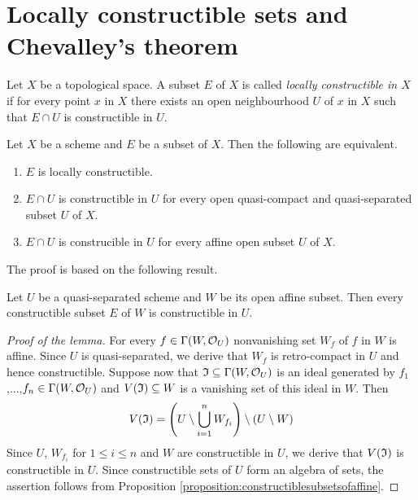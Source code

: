 \section{Locally constructible sets and Chevalley's theorem}

\begin{definition}
Let $X$ be a topological space. A subset $E$ of $X$ is called \textit{locally constructible in $X$} if for every point $x$ in $X$ there exists an open neighbourhood $U$ of $x$ in $X$ such that $E\cap U$ is constructible in $U$.
\end{definition}

\begin{theorem}\label{theorem:locallyconstructibleonschemes}
Let $X$ be a scheme and $E$ be a subset of $X$. Then the following are equivalent.
\begin{enumerate}[label=\emph{\textbf{(\roman*)}}, leftmargin=*]
\item $E$ is locally constructible.
\item $E\cap U$ is constructible in $U$ for every open quasi-compact and quasi-separated subset $U$ of $X$.
\item $E\cap U$ is construcible in $U$ for every affine open subset $U$ of $X$.
\end{enumerate} 
\end{theorem}
\noindent
The proof is based on the following result.

\begin{lemma}\label{lemma:affineinqsandcontructibility}
Let $U$ be a quasi-separated scheme and $W$ be its open affine subset. Then every constructible subset $E$ of $W$ is constructible in $U$.
\end{lemma}
\begin{proof}[Proof of the lemma]
For every $f\in \Gamma(W,{\mathcal O}_U)$ nonvanishing set $W_f$ of $f$ in $W$ is affine. Since $U$ is quasi-separated, we derive that $W_f$ is retro-compact in $U$ and hence constructible. Suppose now that $\mathfrak{I}\subseteq \Gamma(W,{\mathcal O}_U)$ is an ideal generated by $f_1$,...,$f_n\in \Gamma(W,{\mathcal O}_U)$ and $V(\mathfrak{I})\subseteq W$ is a vanishing set of this ideal in $W$. Then
$$V(\mathfrak{I}) = \left(U\setminus \bigcup_{i=1}^nW_{f_i}\right)\setminus \left(U\setminus W\right)$$
Since $U$, $W_{f_i}$ for $1\leq i\leq n$ and $W$ are constructible in $U$, we derive that $V(\mathfrak{I})$ is constructible in $U$. Since constructible sets of $U$ form an algebra of sets, the assertion follows from Proposition \ref{proposition:constructiblesubsetsofaffine}.
\end{proof}

